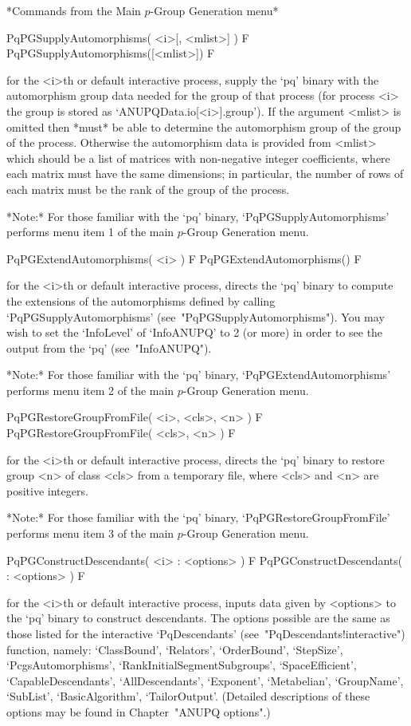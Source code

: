*Commands from the Main $p$-Group Generation menu*

\>PqPGSupplyAutomorphisms( <i>[, <mlist>] ) F
\>PqPGSupplyAutomorphisms([<mlist>]) F

for the <i>th or default interactive {\ANUPQ} process,  supply  the  `pq'
binary with the automorphism group data needed  for  the  group  of  that
process    (for    process    <i>    the    group    is     stored     as
`ANUPQData.io[<i>].group'). If  the  argument  <mlist>  is  omitted  then
{\GAP} *must* be able to determine the automorphism group of the group of
the process. Otherwise the automorphism data  is  provided  from  <mlist>
which  should  be  a  list  of   matrices   with   non-negative   integer
coefficients, where  each  matrix  must  have  the  same  dimensions;  in
particular, the number of rows of each matrix must be  the  rank  of  the
group of the process.

*Note:*
For  those  familiar  with  the  `pq'  binary,  `PqPGSupplyAutomorphisms'
performs menu item 1 of the main $p$-Group Generation menu.

\>PqPGExtendAutomorphisms( <i> ) F
\>PqPGExtendAutomorphisms() F

for the <i>th or default interactive {\ANUPQ} process, directs  the  `pq'
binary to compute the extensions of the automorphisms defined by  calling
`PqPGSupplyAutomorphisms' (see~"PqPGSupplyAutomorphisms"). You  may  wish
to set the `InfoLevel' of `InfoANUPQ' to 2 (or more) in order to see  the
output from the `pq' (see~"InfoANUPQ").

*Note:*    
For  those  familiar  with  the  `pq'  binary,  `PqPGExtendAutomorphisms'
performs menu item 2 of the main $p$-Group Generation menu. 

\>PqPGRestoreGroupFromFile( <i>, <cls>, <n> ) F
\>PqPGRestoreGroupFromFile( <cls>, <n> ) F

for the <i>th or default interactive {\ANUPQ} process, directs  the  `pq'
binary to restore group <n> of class <cls> from a temporary  file,  where
<cls> and <n> are positive integers.

*Note:* 
For those  familiar  with  the  `pq'  binary,  `PqPGRestoreGroupFromFile'
performs menu item 3 of the main $p$-Group Generation menu.

\>PqPGConstructDescendants( <i> : <options> ) F
\>PqPGConstructDescendants( : <options> ) F

for the <i>th or default interactive {\ANUPQ} process, inputs data  given
by <options> to the `pq' binary to  construct  descendants.  The  options
possible are the same as those listed for the interactive `PqDescendants'
(see~"PqDescendants!interactive")   function,    namely:    `ClassBound',
`Relators',      `OrderBound',      `StepSize',      `PcgsAutomorphisms',
`RankInitialSegmentSubgroups',  `SpaceEfficient',   `CapableDescendants',
`AllDescendants',  `Exponent',  `Metabelian',   `GroupName',   `SubList',
`BasicAlgorithm', `TailorOutput'. (Detailed descriptions of these options
may be found in Chapter~"ANUPQ options".)

